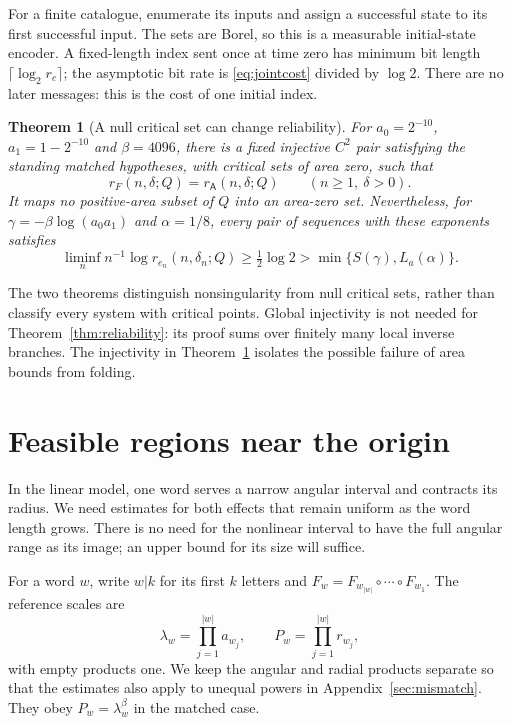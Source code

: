 \documentclass[11pt]{amsart}
\newtheorem{theorem}{Theorem}[section]
\theoremstyle{definition}
\theoremstyle{remark}
\numberwithin{equation}{section}
\begin{document}
For a finite catalogue, enumerate its inputs and assign a successful
state to its first successful input. The sets are Borel, so this is a
measurable initial-state encoder. A fixed-length index sent once at
time zero has minimum bit length $\lceil\log_2 r_e\rceil$; the
asymptotic bit rate is \eqref{eq:jointcost} divided by $\log2$.
There are no later messages: this is the cost of one initial index.

\begin{theorem}[A null critical set can change reliability]
\label{thm:counter}
For $a_0=2^{-10}$, $a_1=1-2^{-10}$ and $\beta=4096$,
there is a fixed injective $C^2$ pair satisfying the standing
matched hypotheses, with critical sets of area zero, such that
\begin{equation}\label{eq:counterfull}
r_F(n,\delta;Q)=r_{\mathsf A}(n,\delta;Q)
                 \qquad(n\ge1,\ \delta>0).
\end{equation}
It maps no positive-area subset of $Q$ into an area-zero set.
Nevertheless, for $\gamma=-\beta\log(a_0a_1)$ and $\alpha=1/8$,
every pair of sequences with these exponents satisfies
\begin{equation}\label{eq:counterrate}
\liminf_n n^{-1}\log r_{e_n}(n,\delta_n;Q)
\ge\tfrac12\log2>\min\{S(\gamma),L_a(\alpha)\}.
\end{equation}
\end{theorem}

The two theorems distinguish nonsingularity from null critical
sets, rather than classify every system with critical points.
Global injectivity is not needed for Theorem~\ref{thm:reliability}:
its proof sums over finitely many local inverse branches.
The injectivity in Theorem~\ref{thm:counter} isolates the possible
failure of area bounds from folding.

\section{Feasible regions near the origin}\label{sec:geometry}
In the linear model, one word serves a narrow angular interval
and contracts its radius. We need estimates for both effects
that remain uniform as the word length grows. There is no need
for the nonlinear interval to have the full angular range as its
image; an upper bound for its size will suffice.

For a word $w$, write $w|k$ for its first $k$ letters and
$F_w=F_{w_{|w|}}\circ\cdots\circ F_{w_1}$. The reference scales are
\[
\lambda_w=\prod_{j=1}^{|w|}a_{w_j},\qquad
P_w=\prod_{j=1}^{|w|}r_{w_j},
\]
with empty products one. We keep the angular and radial products
separate so that the estimates also apply to unequal powers in
Appendix~\ref{sec:mismatch}. They obey $P_w=\lambda_w^\beta$
in the matched case.
\end{document}
